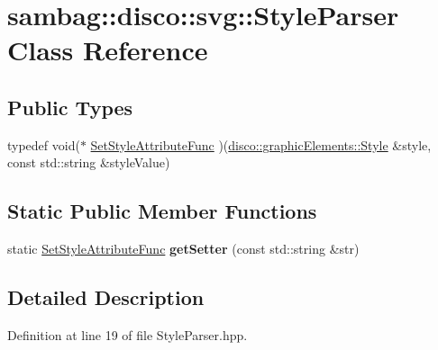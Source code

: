 \hypertarget{classsambag_1_1disco_1_1svg_1_1_style_parser}{
\section{sambag::disco::svg::StyleParser Class Reference}
\label{classsambag_1_1disco_1_1svg_1_1_style_parser}
}
\subsection*{Public Types}
\begin{DoxyCompactItemize}
\item 
typedef void($\ast$ \hyperlink{classsambag_1_1disco_1_1svg_1_1_style_parser_aefae8d683c18953670e2cba8471a8c93}{SetStyleAttributeFunc} )(\hyperlink{classsambag_1_1disco_1_1graphic_elements_1_1_style}{disco::graphicElements::Style} \&style, const std::string \&styleValue)
\end{DoxyCompactItemize}
\subsection*{Static Public Member Functions}
\begin{DoxyCompactItemize}
\item 
\hypertarget{classsambag_1_1disco_1_1svg_1_1_style_parser_aa9c1bcacbe9756831bef2e80c61e3eb4}{
static \hyperlink{classsambag_1_1disco_1_1svg_1_1_style_parser_aefae8d683c18953670e2cba8471a8c93}{SetStyleAttributeFunc} {\bfseries getSetter} (const std::string \&str)}
\label{classsambag_1_1disco_1_1svg_1_1_style_parser_aa9c1bcacbe9756831bef2e80c61e3eb4}

\end{DoxyCompactItemize}


\subsection{Detailed Description}


Definition at line 19 of file StyleParser.hpp.




